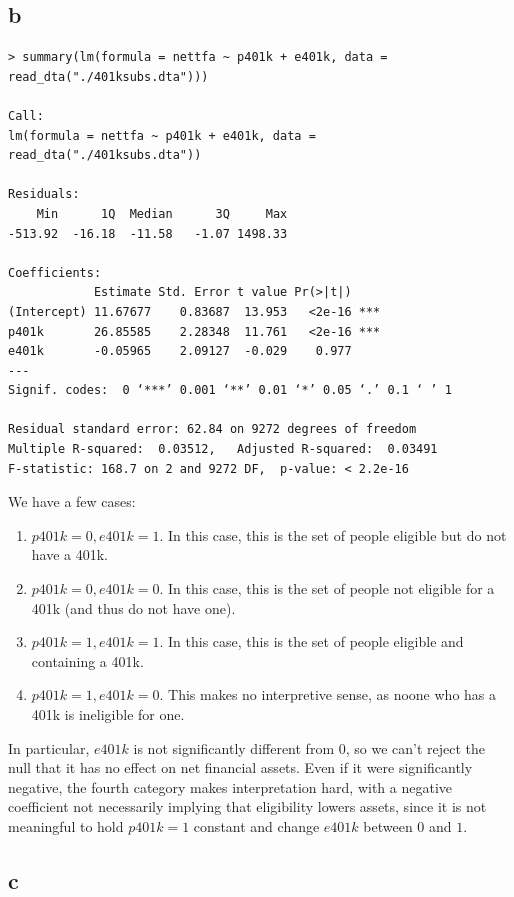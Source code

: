 \documentclass[12pt,letterpaper]{article}
\theoremstyle{definition}
\begin{document}
\subsection*{b}

\begin{Verbatim}[fontsize=\small]
> summary(lm(formula = nettfa ~ p401k + e401k, data = read_dta("./401ksubs.dta")))

Call:
lm(formula = nettfa ~ p401k + e401k, data = read_dta("./401ksubs.dta"))

Residuals:
    Min      1Q  Median      3Q     Max
-513.92  -16.18  -11.58   -1.07 1498.33

Coefficients:
            Estimate Std. Error t value Pr(>|t|)
(Intercept) 11.67677    0.83687  13.953   <2e-16 ***
p401k       26.85585    2.28348  11.761   <2e-16 ***
e401k       -0.05965    2.09127  -0.029    0.977
---
Signif. codes:  0 ‘***’ 0.001 ‘**’ 0.01 ‘*’ 0.05 ‘.’ 0.1 ‘ ’ 1

Residual standard error: 62.84 on 9272 degrees of freedom
Multiple R-squared:  0.03512,	Adjusted R-squared:  0.03491
F-statistic: 168.7 on 2 and 9272 DF,  p-value: < 2.2e-16
\end{Verbatim}

We have a few cases:
\begin{enumerate}
  \item $p401k = 0, e401k = 1$. In this case, this is the set of people eligible but do not have a 401k.
  \item $p401k = 0, e401k = 0$. In this case, this is the set of people not eligible for a 401k (and thus do not have one).
  \item $p401k = 1, e401k = 1$. In this case, this is the set of people eligible and containing a 401k.
  \item $p401k = 1, e401k = 0$. This makes no interpretive sense, as noone who has a 401k is ineligible for one.
\end{enumerate}

In particular, $e401k$ is not significantly different from 0, so we can't reject the null that it has no effect on net financial assets. Even if it were significantly negative, the fourth category makes interpretation hard, with a negative coefficient not necessarily implying that eligibility lowers assets, since it is not meaningful to hold $p401k = 1$ constant and change $e401k$ between $0$ and $1$.

\subsection*{c}
\end{document}
